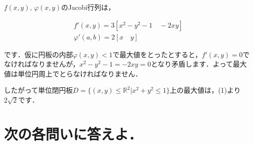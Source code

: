 \documentclass[a4paper,10pt]{jarticle}
\begin{document}
\begin{enumerate}
$f(x,y),\,\varphi(x,y)$のJacobi行列は，
\begin{fleqn}[30pt] \begin{gather*}
	f'(x,y) = 3\left[x^2-y^2-1 \quad -2xy\right] \\
	\varphi'(a,b) = 2\left[x \quad y\right]
\end{gather*} \end{fleqn}
です．仮に円板の内部$\varphi(x,y) < 1$で最大値をとったとすると，$f'(x,y) = 0$でなければなりませんが，$x^2-y^2-1=-2xy=0$となり矛盾します．よって最大値は単位円周上でとらなければなりません．

したがって単位閉円板$D=\{(x,y) \leq \mathbb{R}^2|x^2+y^2 \leq 1\}$上の最大値は，(1)より$2\sqrt{2}$です．
\end{enumerate}

\section{次の各問いに答えよ．}
\end{document}
